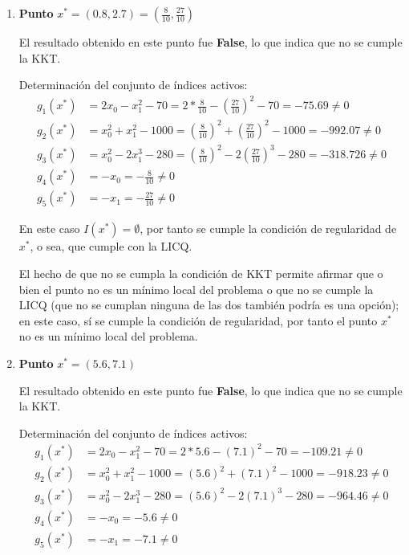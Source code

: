 \documentclass[titlepage, 11pt]{scrartcl}
\begin{document}
\begin{enumerate}
\begin{enumerate}
		\begin{enumerate}
			\item \textbf{Punto} $x^* = (0.8, 2.7) = (\frac{8}{10}, \frac{27}{10})$
			
			El resultado obtenido en este punto fue \textbf{False}, lo que indica que no se cumple la KKT.
			
			Determinaci\'on del conjunto de \'indices activos:
			\begin{align*}
			g_1(x^*) &= 2x_0 - x_1^2 - 70 = 2 * \frac{8}{10} - (\frac{27}{10})^2 - 70 = -75.69\neq 0\\
			g_2(x^*) &= x_0^2 + x_1^2- 1000 = (\frac{8}{10})^2 + (\frac{27}{10})^2 - 1000 = -992.07 \neq 0\\
			g_3(x^*) &= x_0^2 - 2 x_1^3 - 280 = (\frac{8}{10})^2 - 2 (\frac{27}{10})^3 - 280 = -318.726 \neq 0\\
			g_4(x^*) &= -x_0 = -\frac{8}{10} \neq 0\\
			g_5(x^*) &= -x_1 = -\frac{27}{10} \neq 0
			\end{align*}
			
			En este caso $I(x^*)  = \emptyset$, por tanto se cumple la condici\'on de regularidad de $x^*$, o sea, que cumple con la LICQ.
			
			El hecho de que no se cumpla la condición de KKT permite afirmar que o bien el punto no es un m\'inimo local del problema o que no se cumple la LICQ (que no se cumplan ninguna de las dos también podría es una opci\'on); en este caso, s\'i se cumple la condici\'on de regularidad, por tanto el punto $x^*$ no es un m\'inimo local del problema.
			
			
		\vspace{7mm}
		\item \textbf{Punto} $x^* = (5.6, 7.1)$
	
		El resultado obtenido en este punto fue \textbf{False}, lo que indica que no se cumple la KKT.
		
		Determinaci\'on del conjunto de \'indices activos:
		\begin{align*}
		g_1(x^*) &= 2x_0 - x_1^2 - 70 = 2 * 5.6 - (7.1)^2 - 70 = -109.21\neq 0\\
		g_2(x^*) &= x_0^2 + x_1^2- 1000 = (5.6)^2 + (7.1)^2 -1000 = -918.23 \neq 0\\
		g_3(x^*) &= x_0^2 - 2 x_1^3 - 280 = (5.6)^2 - 2(7.1)^3 - 280 = -964.46 \neq 0\\
		g_4(x^*) &= -x_0 = -5.6 \neq 0\\
		g_5(x^*) &= -x_1 = -7.1 \neq 0
		\end{align*}
		

\end{enumerate}
\end{enumerate}
\end{enumerate}
\end{document}
